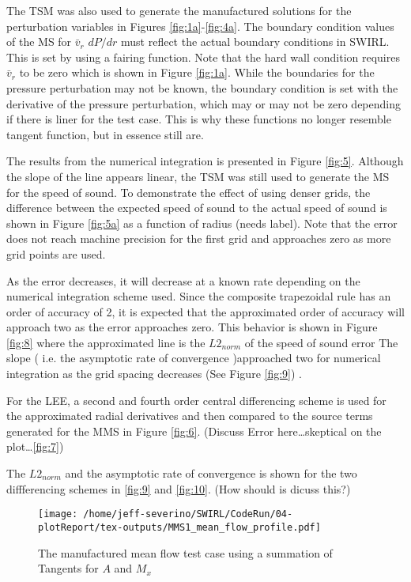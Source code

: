 The TSM was also used to generate the manufactured solutions for the perturbation
variables in Figures \ref{fig:1a}-\ref{fig:4a}. The boundary condition values of 
the MS for $\bar{v}_r$ $dP/dr$ must reflect the actual boundary conditions in SWIRL. 
This is set by using a fairing function. Note that the hard wall condition requires
$\bar{v}_r$ to be zero which is shown in Figure \ref{fig:1a}. While the boundaries for the 
pressure perturbation may not be known, the boundary condition is set with the 
derivative of the pressure perturbation, which may or may not be zero depending
if there is liner for the test case. This is why these functions no longer resemble
tangent function, but in essence still are. 

The results from the numerical integration is presented in Figure \ref{fig:5}. Although 
the slope of the line appears linear, the TSM was still used to generate the 
MS for the speed of sound. To demonstrate the effect of using denser grids, the 
difference between the expected speed of sound to the actual speed of sound is 
shown in Figure \ref{fig:5a} as a function of radius (needs label). 
Note that the error does not reach machine precision for the first grid and 
approaches zero as more grid points are used. 

As the error decreases, it will decrease at a known rate depending on the numerical
integration scheme used. Since the composite trapezoidal rule has an order of accuracy of 2, 
it is expected that the approximated order of accuracy will approach two as
the error approaches zero. This behavior is shown in Figure \ref{fig:8} where the approximated
line is the $L2_{norm}$ of the speed of sound error 
 The slope ( i.e. the asymptotic rate of convergence )approached two for 
 numerical integration as the grid spacing decreases (See Figure \ref{fig:9}) .

For the LEE, a second and fourth order central differencing scheme is used
for the approximated radial derivatives and then compared to the source terms 
generated for the MMS in Figure \ref{fig:6}. (Discuss Error here\dots skeptical 
on the plot\dots \ref{fig:7})

The $L2_{norm}$ and the  asymptotic rate of convergence is shown for the 
two diffferencing schemes in  \ref{fig:9} and \ref{fig:10}. (How should is dicuss this?) 


\begin{figure}[!]
    \centering
    \texttt{[image: /home/jeff-severino/SWIRL/CodeRun/04-plotReport/tex-outputs/MMS1\_mean\_flow\_profile.pdf]}
    \caption{The manufactured mean flow test case using a summation of Tangents for $A$ and $M_x$}
    \label{fig:1}
\end{figure}


